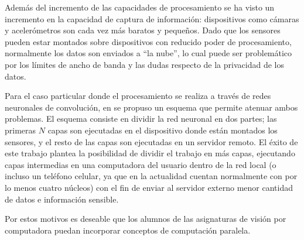 Además del incremento de las capacidades de procesamiento se ha visto un
incremento en la capacidad de captura de información: dispositivos como cámaras
y acelerómetros son cada vez más baratos y pequeños. Dado que los sensores
pueden estar montados sobre dispositivos con reducido poder de procesamiento,
normalmente los datos son enviados a ``la nube'', lo cual puede ser problemático
por los límites de ancho de banda y las dudas respecto de la privacidad de los
datos.

Para el caso particular donde el procesamiento se realiza a través de redes
neuronales de convolución, en \cite{pipelinebasedCaffe2017} se propuso un
esquema que permite atenuar ambos problemas. El esquema consiste en dividir la
red neuronal en dos partes; las primeras $N$ capas son ejecutadas en el
dispositivo donde están montados los sensores, y el resto de las capas son
ejecutadas en un servidor remoto. El éxito de este trabajo plantea la
posibilidad de dividir el trabajo en más capas, ejecutando capas intermedias en
una computadora del usuario dentro de la red local (o incluso un teléfono
celular, ya que en la actualidad cuentan normalmente con por lo menos cuatro
núcleos) con el fin de enviar al servidor externo menor cantidad de datos e
información sensible.

Por estos motivos es deseable que los alumnos de las asignaturas de visión por
computadora puedan incorporar conceptos de computación paralela.
